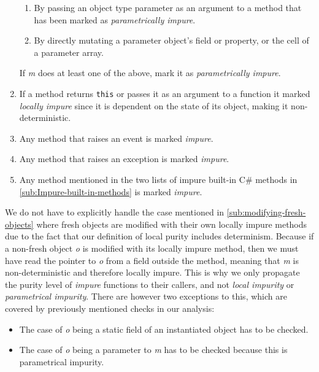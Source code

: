 \documentclass[a4paper,12pt]{article}
\begin{document}
\begin{enumerate}
\begin{enumerate}
      \item By passing an object type parameter as an argument to a method that has been marked as \textit{parametrically impure}. \label{itm:parametrically-impure-sub2}
      \item By directly mutating a parameter object's field or property, or the cell of a parameter array. \label{itm:parametrically-impure-sub3}
    \end{enumerate}
    If \textit{m} does at least one of the above, mark it as \textit{parametrically impure}.
  \item If a method returns \texttt{this} or passes it as an argument to a function it marked \textit{locally impure} since it is dependent on the state of its object, making it non-deterministic.
  \item Any method that raises an event is marked \textit{impure}. \label{itm:raises-event}
  \item Any method that raises an exception is marked \textit{impure}. \label{itm:raises-exception}
  \item Any method mentioned in the two lists of impure built-in C\# methods in \autoref{sub:Impure-built-in-methods} is marked \textit{impure}. \label{itm:impure-built-in}
\end{enumerate}

We do not have to explicitly handle the case mentioned in \autoref{sub:modifying-fresh-objects} where fresh objects are modified with their own locally impure methods due to the fact that our definition of local purity includes determinism. Because if a non-fresh object \textit{o} is modified with its locally impure method, then we must have read the pointer to \textit{o} from a field outside the method, meaning that \textit{m} is non-deterministic and therefore locally impure. This is why we only propagate the purity level of \textit{impure} functions to their callers, and not \textit{local impurity} or \textit{parametrical impurity}. There are however two exceptions to this, which are covered by previously mentioned checks in our analysis:
\begin{itemize}
  \item The case of \textit{o} being a static field of an instantiated object has to be checked.
  \item The case of \textit{o} being a parameter to \textit{m} has to be checked because this is parametrical impurity.
\end{itemize}
\end{document}
